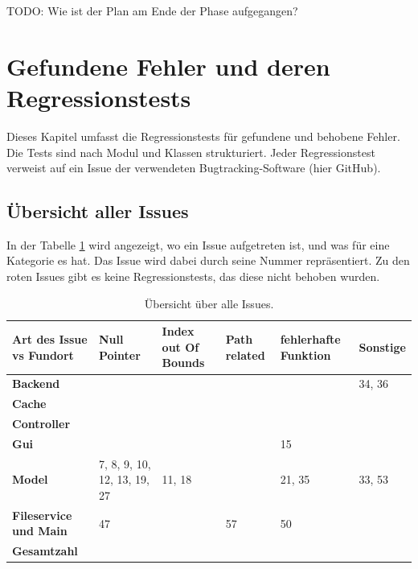 \documentclass[parskip=full]{scrartcl}
\begin{document}
TODO: Wie ist der Plan am Ende der Phase aufgegangen?


\clearpage
\section{Gefundene Fehler und deren Regressionstests} \label{regression}

Dieses Kapitel umfasst die Regressionstests für gefundene und behobene Fehler. Die Tests sind nach Modul und Klassen strukturiert. Jeder Regressionstest verweist auf ein Issue der verwendeten Bugtracking-Software (hier GitHub).

\subsection{Übersicht aller Issues}
In der Tabelle \ref{issueOverView} wird angezeigt, wo ein Issue aufgetreten ist, und was für eine Kategorie es hat. Das Issue wird dabei durch seine Nummer repräsentiert. Zu den roten Issues gibt es keine Regressionstests, das diese nicht behoben wurden.

\begin{table}[h]
\begin{tabular}{| p{3cm} | p{} | p{}  |p{} |p{} |p{}|}
	\hline
	\textbf{Art des Issue vs Fundort} & \textbf{Null Pointer} & \textbf{Index out Of Bounds} & \textbf{Path related} & \textbf{fehlerhafte Funktion} & \textbf{Sonstige} \\ \hline
	\textbf{Backend}
	& 
	
	&
	
	&
	
	&
	
	&
	34, 36
	\\ \hline
	
	\textbf{Cache}
	& 
	
	&
		
	&
	&
	&
	\\ \hline
	
	\textbf{Controller}
	& 
	
	&

	&
	&
	&
	\\ \hline
	\textbf{Gui}
	& 
	
	&
	&
	
	
	&
	15
	&
	\\ \hline
	
	\textbf{Model}
	& 
	7, 8, 9, 10, 12, 13, 19, 27
	&
	11, 18
	&	
	
	&
	21, 35
	&
	33, 53
	\\ \hline
	
	\textbf{Fileservice und Main}
	& 
	47
	&
	
	&
	57
	&
	50
	&
		
	\\ \hline

	\textbf{Gesamtzahl}
	& 
	&
	&
	&
	&
	\\ \hline
	
\end{tabular}
\caption{Übersicht über alle Issues.}
\label{issueOverView}
\end{table}
\end{document}
